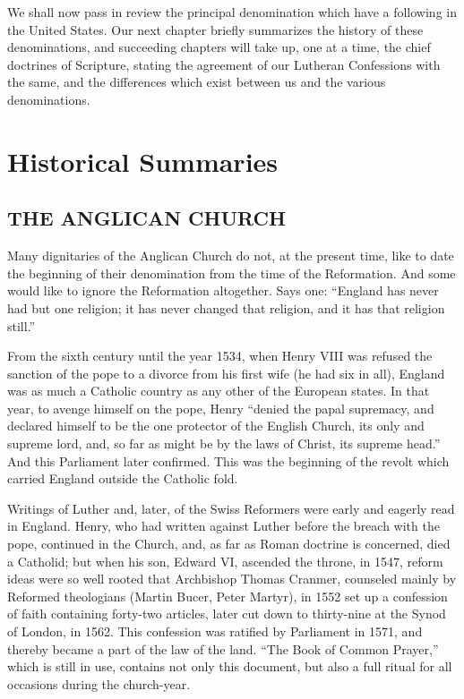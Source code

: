\documentclass[
]{book}
\def\igobble#1{}
\begin{document}
We shall now pass in review the principal denomination which have a following in the United States. Our next chapter briefly summarizes the history of these denominations, and succeeding chapters will take up, one at a time, the chief doctrines of Scripture, stating the agreement of our Lutheran Confessions with the same, and the differences which exist between us and the various denominations.

\section{Historical Summaries}\label{historical-summaries}

\subsection{THE ANGLICAN CHURCH}\label{the-anglican-church}

Many dignitaries of the Anglican\index{Anglican Church!zzzzz@\igobble|seealso{Episcopal Church}} Church do not, at the present time, like to date the beginning of their denomination from the time of the Reformation. And some would like to ignore the Reformation altogether. Says one: ``England has never had but one religion; it has never changed that religion, and it has that religion still.''

From the sixth century until the year 1534, when Henry VIII was refused the sanction of the pope to a divorce from his first wife (he had six in all), England was as much a Catholic country as any other of the European states. In that year, to avenge himself on the pope, Henry ``denied the papal supremacy, and declared himself to be the one protector of the English Church, its only and supreme lord, and, so far as might be by the laws of Christ, its supreme head.'' And this Parliament later confirmed. This was the beginning of the revolt which carried England outside the Catholic fold.

Writings of Luther and, later, of the Swiss Reformers were early and eagerly read in England. Henry, who had written against Luther before the breach with the pope, continued in the Church, and, as far as Roman doctrine is concerned, died a Catholid; but when his son, Edward VI, ascended the throne, in 1547, reform ideas were so well rooted that Archbishop Thomas Cranmer, counseled mainly by Reformed theologians (Martin Bucer, Peter Martyr), in 1552 set up a confession of faith containing forty-two articles, later cut down to thirty-nine at the Synod of London, in 1562. This confession was ratified by Parliament in 1571, and thereby became a part of the law of the land. ``The Book of Common Prayer,'' which is still in use, contains not only this document, but also a full ritual for all occasions during the church-year.
\end{document}
